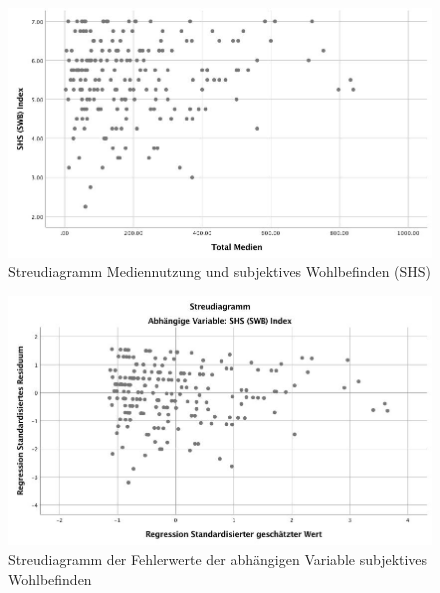 \begin{figure}[h]
  \centering
     \includegraphics[scale=0.4]{content/Grafik/Streudiagramm_Hypo3.jpg}
  \caption{Streudiagramm Mediennutzung und subjektives Wohlbefinden (SHS)}
  \label{fig:AppHypo3Streudiagramm}
\end{figure}

\begin{figure}[h]
  \centering
     \includegraphics[scale=0.4]{content/Grafik/Streudiagramm_Hypo3_Residuen.jpg}
  \caption{Streudiagramm der Fehlerwerte  der abhängigen Variable subjektives Wohlbefinden}
  \label{fig:AppHypo3StreudiagrammResiduen}
\end{figure}
